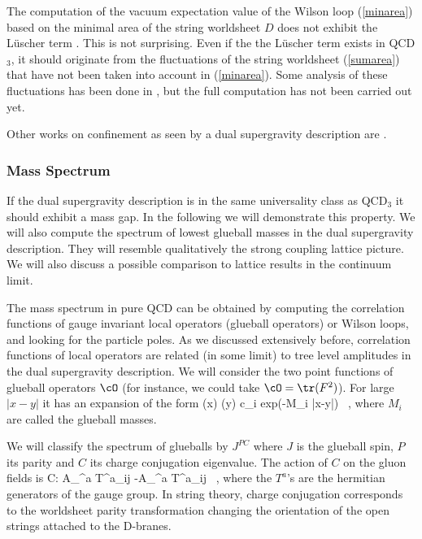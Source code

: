 The computation of the vacuum expectation value of the Wilson loop
(\ref{minarea}) based on the minimal area of the string worldsheet $D$
does not exhibit the L\"uscher term \cite{Greensite:1998ro}.  This is
not surprising. Even if the the L\"uscher term exists in QCD$_3$, it
should originate from the fluctuations of the string worldsheet
(\ref{sumarea}) that have not been taken into account in
(\ref{minarea}).  Some analysis of these fluctuations has been done
in \cite{Greensite:1999wf}, 
but the full computation has not been carried out yet.  


Other works on confinement as seen by a dual supergravity description are
\cite{Dorn:1998tu,Kinar:1998xx,Danielsson:1999wt,
Naik:1999bs}.

\subsubsection{Mass Spectrum}

If the dual supergravity description is in the same universality class
as QCD$_3$ it should exhibit a mass gap.  In the following we will
demonstrate this property. We will also compute the spectrum of lowest
glueball masses in the dual supergravity description.  They will
resemble qualitatively the strong coupling lattice picture.  We will
also discuss a possible comparison to lattice results in the continuum
limit.

The mass spectrum in pure QCD can be obtained by computing the
correlation functions of gauge invariant local operators (glueball
operators) or Wilson loops, and looking for the particle poles.  As we
discussed extensively before, correlation functions of local operators
are related (in some limit)
to tree level amplitudes in the dual supergravity
description.  We will consider the two point functions of glueball
operators $\cO$ (for instance, we could take $\cO = \tr(F^2)$).  
For large $|x-y|$ it has an expansion of the form
\beq
\langle \cO(x) \cO(y) \rangle \simeq \sum c_i exp(-M_i |x-y|) \ ,
\label{corr}
\eeq
where $M_i$ are called the glueball masses.

We will classify the spectrum of
glueballs by $J^{PC}$ where $J$ is the glueball spin, $P$ its parity
and $C$ its charge conjugation eigenvalue. 
The action of $C$ on the gluon fields is \cite{Mandula:1983cl}
\beq
C: A_{\mu}^a T^a_{ij} \rightarrow -A_{\mu}^a T^a_{ij} \ ,
\eeq
where the $T^a$'s are the hermitian generators of the gauge group.
In string theory, charge conjugation corresponds to the worldsheet parity
transformation changing the orientation of the open strings attached to the
D-branes.

